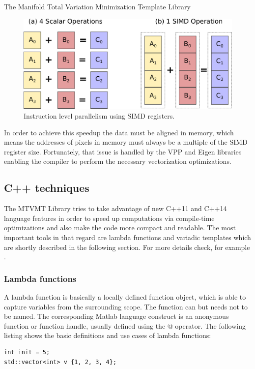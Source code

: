 \begin{chapter}{The Manifold Total Variation Minimization Template Library}
\begin{figure}[h!]
        \centering
	    \includegraphics[width=0.7\linewidth]{./figures/library/SIMD.pdf}
	\caption[SIMD parallelization]{Instruction level parallelism using SIMD registers.
	}
	\label{fig:simd}
\end{figure}

In order to achieve this speedup the data must be aligned in memory, which means the addresses of pixels in memory must always be a multiple of the SIMD register size. Fortunately,
that issue is handled by the VPP and Eigen libraries enabling the compiler to perform the necessary vectorization optimizations.



\subsection{C++ techniques} %
\label{sub:C++ techniques}
The MTVMT Library tries to take advantage of new C++11 and C++14 language features in order to speed up computations via compile-time optimizations and also make the code
more compact and readable. The most important tools in that regard are lambda functions and variadic templates which are shortly described in the following section.
For more details check, for example \cite{CPPEleven}.

\subsubsection{Lambda functions} %
\label{ssub:Lambda functions}
A lambda function is basically a locally defined function object, which is able to capture variables from the surrounding scope. The function can but needs not to be named.
The corresponding Matlab language construct is an anonymous function or function handle, usually defined using the @ operator. The following listing
shows the basic definitions and use cases of lambda functions:\\

\cppinline
\begin{lstlisting}[label=code:lambdafun,caption={Lambda functions}]
int init = 5;
std::vector<int> v {1, 2, 3, 4};


\end{lstlisting}
\end{chapter}
